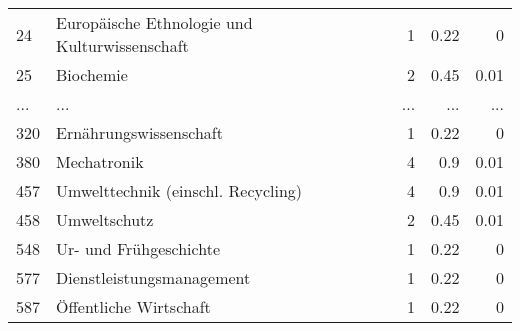 \begin{longtable}{lXrrr}
        24 & \multicolumn{1}{X}{Europäische Ethnologie und Kulturwissenschaft} & %
          \num{1} &
          \num[round-mode=places,round-precision=2]{0.22} &
          \num[round-mode=places,round-precision=2]{0} \\
        25 & \multicolumn{1}{X}{Biochemie} & %
          \num{2} &
          \num[round-mode=places,round-precision=2]{0.45} &
          \num[round-mode=places,round-precision=2]{0.01} \\
       ... & ... & ... & ... & ... \\
        320 & \multicolumn{1}{X}{Ernährungswissenschaft} & %
          \num{1} &
          \num[round-mode=places,round-precision=2]{0.22} &
          \num[round-mode=places,round-precision=2]{0} \\

        380 & \multicolumn{1}{X}{Mechatronik} & %
          \num{4} &
          \num[round-mode=places,round-precision=2]{0.9} &
          \num[round-mode=places,round-precision=2]{0.01} \\

        457 & \multicolumn{1}{X}{Umwelttechnik (einschl. Recycling)} & %
          \num{4} &
          \num[round-mode=places,round-precision=2]{0.9} &
          \num[round-mode=places,round-precision=2]{0.01} \\

        458 & \multicolumn{1}{X}{Umweltschutz} & %
          \num{2} &
          \num[round-mode=places,round-precision=2]{0.45} &
          \num[round-mode=places,round-precision=2]{0.01} \\

        548 & \multicolumn{1}{X}{Ur- und Frühgeschichte} & %
          \num{1} &
          \num[round-mode=places,round-precision=2]{0.22} &
          \num[round-mode=places,round-precision=2]{0} \\

        577 & \multicolumn{1}{X}{Dienstleistungsmanagement} & %
          \num{1} &
          \num[round-mode=places,round-precision=2]{0.22} &
          \num[round-mode=places,round-precision=2]{0} \\

        587 & \multicolumn{1}{X}{Öffentliche Wirtschaft} & %
          \num{1} &
          \num[round-mode=places,round-precision=2]{0.22} &
          \num[round-mode=places,round-precision=2]{0} \\


\end{longtable}
